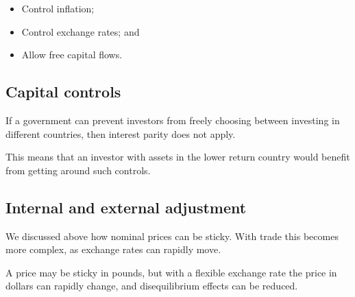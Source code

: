\begin{itemize}
\item Control inflation;
\item Control exchange rates; and
\item Allow free capital flows.
\end{itemize}

\subsection{Capital controls}

If a government can prevent investors from freely choosing between investing in different countries, then interest parity does not apply.

This means that an investor with assets in the lower return country would benefit from getting around such controls.

\subsection{Internal and external adjustment}

We discussed above how nominal prices can be sticky. With trade this becomes more complex, as exchange rates can rapidly move.

A price may be sticky in pounds, but with a flexible exchange rate the price in dollars can rapidly change, and disequilibrium effects can be reduced.

